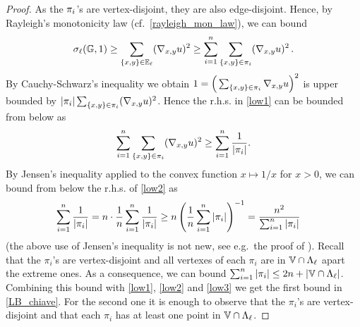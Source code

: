 \documentclass[12pt,a4paper,reqno]{amsart}
\newcommand{\cG}{\ensuremath{\mathcal G}}
\newcommand{\bbE}{{\ensuremath{\mathbb E}} }
\newcommand{\bbG}{{\ensuremath{\mathbb G}} }
\newcommand{\bbV}{{\ensuremath{\mathbb V}} }
\begin{document}
\begin{proof}
As the $\pi_i$'s are vertex-disjoint, they are also edge-disjoint. Hence, by Rayleigh's monotonicity law (cf.~\eqref{rayleigh_mon_law}),  we can bound 
\begin{equation}
\label{low1}
\s_\ell (\bbG,1) \geq \sum_{\{x,y\}\in \bbE_\ell}  (\nabla_{x,y} u)^2 \geq\sum_{i=1}^n\sum_{\{x,y\}\in \p_i}(\nabla_{x,y} u)^2 
\,.
\end{equation}
By Cauchy-Schwarz's inequality we obtain  $1=\Big(\sum_{\{x,y\}\in \pi_i}\nabla_{x,y} u\Big)^2$ is upper bounded by $ |\pi_i|\sum_{\{x,y\}\in \pi_i} (\nabla_{x,y} u)^2$.
Hence the r.h.s. in \eqref{low1} can be bounded from below as
\begin{equation}
\label{low2}
\begin{split}
\sum_{i=1}^n\sum_{\{x,y\}\in \pi_i} (\nabla_{x,y} u)^2\geq  \sum_{i=1}^n\frac{1}{|\pi_i|}.
\end{split}
\end{equation}
By Jensen's inequality  applied to the convex function $ x \mapsto 1/x$ for $x>0$,  we can bound from below the r.h.s. of \eqref{low2} as
\begin{equation}
\label{low3}
\begin{split}
 \sum_{i=1}^n\frac{1}{|\pi_i|}&=n \cdot\frac{1}{n}\sum_{i=1}^n\frac{1}{|\pi_i|}\geq n\left(\frac{1}{n}\sum_{i=1}^n|\pi_i|\right)^{-1}
=\frac{n^2 }{\sum_{i=1}^n|\pi_i|}
\end{split}
\end{equation}
(the above use of Jensen's inequality is not new,  see e.g.~the proof of  \cite[Prop.~3.2]{CC}).
Recall  that the $\pi_i$'s are vertex-disjoint  and  all vertexes of each $\pi_i$ are in $\bbV \cap \L_\ell$ apart the extreme ones.
As a consequence, we can bound  $\sum_{i=1}^n|\p_i|\leq  2n +| \bbV \cap \L_\ell|$.
 Combining this bound with \eqref{low1}, \eqref{low2} and \eqref{low3} we get  the first bound in \eqref{LB_chiave}. For the second one it is enough to observe  that the $\pi_i$'s are vertex-disjoint and that each $\pi_i$ has at least one point in $\bbV \cap \L_\ell$.
\end{proof}



\end{document}
